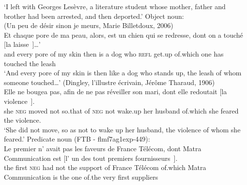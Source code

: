 \glt `I left with Georges Lesèvre, a literature student whose mother, father and brother had been arrested, and then deported.'
\label{ex:d2000-subj}
\ex Object noun:\\
(Un peu de désir sinon je meurs, Marie Billetdoux, 2006)\\
\gll Et chaque pore de ma peau, alors, est un chien qui se redresse, dont on a touché [la laisse~\trace{}]\dots'\\
and every pore of my skin then is a dog who \textsc{refl} get.up of.which one has touched the leash\\
\glt `And every pore of my skin is then like a dog who stands up, the leash of whom someone touched\dots'
\ex (Dingley, l'illustre écrivain, Jérôme Tharaud, 1906)\\
\gll Elle ne bougea pas, afin de ne pas réveiller son mari, dont elle redoutait [la violence~\trace{}].\\
she \textsc{neg} moved not so.that of \textsc{neg} not wake.up her husband of.which she feared the violence.\\
\glt `She did not move, so as not to wake up her husband, the violence of whom she feared.'
\pagebreak
\ex Predicate noun (FTB - flmf7ag1exp-449):\\
\gll Le premier n' avait pas les faveurs de France Télécom, dont Matra Communication est [l' un des tout premiers fournisseurs~\trace{}].\\
the first \textsc{neg} had not the support of France Télécom of.which Matra Communication is the one of.the very first suppliers\\

